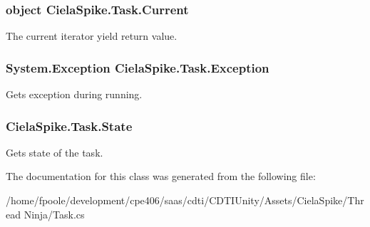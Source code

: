 \subsubsection[{Current}]{\setlength{\rightskip}{0pt plus 5cm}object Ciela\+Spike.\+Task.\+Current\hspace{0.3cm}{\ttfamily [get]}}\label{class_ciela_spike_1_1_task_a1b998f7aa927571627df0e146693c5a4}


The current iterator yield return value. 

\hypertarget{class_ciela_spike_1_1_task_a16f755d6c2d90b3d528aebc7526a0a2b}{}
\subsubsection[{Exception}]{\setlength{\rightskip}{0pt plus 5cm}System.\+Exception Ciela\+Spike.\+Task.\+Exception\hspace{0.3cm}{\ttfamily [get]}}\label{class_ciela_spike_1_1_task_a16f755d6c2d90b3d528aebc7526a0a2b}


Gets exception during running. 

\hypertarget{class_ciela_spike_1_1_task_a0b9fb190966ab28515afb40541ba23cf}{}
\subsubsection[{State}]{ Ciela\+Spike.\+Task.\+State\hspace{0.3cm}{\ttfamily [get]}}\label{class_ciela_spike_1_1_task_a0b9fb190966ab28515afb40541ba23cf}


Gets state of the task. 



The documentation for this class was generated from the following file\+:\begin{DoxyCompactItemize}
\item 
/home/fpoole/development/cpe406/saas/cdti/\+C\+D\+T\+I\+Unity/\+Assets/\+Ciela\+Spike/\+Thread Ninja/Task.\+cs\end{DoxyCompactItemize}
